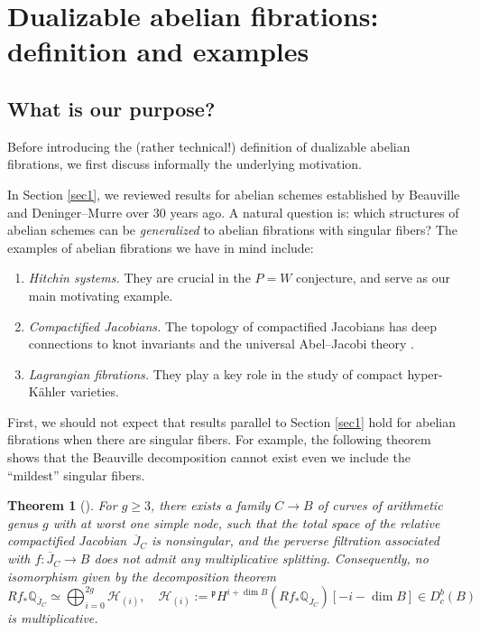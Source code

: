\documentclass[11pt]{amsart}
\theoremstyle{plain}
\newtheorem{thm}{Theorem}[section]
\theoremstyle{definition}
\theoremstyle{remark}
\newcommand{\BQ}{{\mathbb{Q}}}
\newcommand{\CH}{{\mathcal H}}
\newcommand{\Fp}{{\mathfrak{p}}}
\begin{document}
\section{Dualizable abelian fibrations: definition and examples}\label{sec2}

\subsection{What is our purpose?}
Before introducing the (rather technical!) definition of dualizable abelian fibrations, we first discuss informally the underlying motivation.



In Section \ref{sec1}, we reviewed results for abelian schemes established by Beauville and Deninger--Murre over 30 years ago. A natural question is: which structures of abelian schemes can be \emph{generalized} to abelian fibrations with singular fibers? The examples of abelian fibrations we have in mind include:
\begin{enumerate}
    \item[(a)] \emph{Hitchin systems.} They are crucial in the $P=W$ conjecture, and serve as our main motivating example.
    \item[(b)] \emph{Compactified Jacobians.} The topology of compactified Jacobians has deep connections to knot invariants \cite{OY, ORS, Shen_survey} and the universal Abel--Jacobi theory \cite{BHPSS, BMP}.
    \item[(c)] \emph{Lagrangian fibrations.} They play a key role in the study of compact hyper-K\"ahler varieties.
\end{enumerate}



First, we should not expect that results parallel to Section \ref{sec1} hold for abelian fibrations when there are singular fibers. For example, the following theorem shows that the Beauville decomposition cannot exist even we include the ``mildest'' singular fibers.

\begin{thm}[\cite{BMSY1}]\label{thm2.1}
For $g\geq 3$, there exists a family $C \to B$ of curves of arithmetic genus $g$ with at worst one simple node, such that the total space of the relative compactified Jacobian~$\overline{J}_C$ is nonsingular, and the perverse filtration associated with $f: \overline{J}_C\to B$ does not admit any multiplicative splitting. Consequently, no isomorphism given by the decomposition theorem 
\[
Rf_*\BQ_{\overline{J}_C} \simeq \bigoplus_{i = 0}^{2g}\CH_{(i)}, \quad \CH_{(i)} := {^\Fp}H^{i + \dim B}(Rf_{*}\BQ_{\overline{J}_C})[-i - \dim B] \in D^b_c(B)
\]
is multiplicative.
\end{thm}
\end{document}
